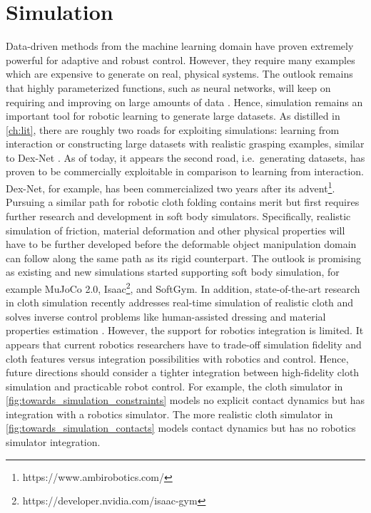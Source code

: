 \documentclass[\home/main.tex]{subfiles}
\begin{document}
\section{Simulation} \label{sec:towards_sim}
Data-driven methods from the machine learning domain have proven extremely powerful for adaptive and robust control. However, they require many examples which are expensive to generate on real, physical systems. The outlook remains that highly parameterized functions, such as neural networks, will keep on requiring and improving on large amounts of data \autocite{sun2017revisiting}. Hence, simulation remains an important tool for robotic learning to generate large datasets. As distilled in \cref{ch:lit}, there are roughly two roads for exploiting simulations: learning from interaction or constructing large datasets with realistic grasping examples, similar to Dex-Net \autocite{dexnet2}. As of today, it appears the second road, i.e.\ generating datasets, has proven to be commercially exploitable in comparison to learning from interaction. Dex-Net, for example, has been commercialized two years after its advent\footnote{https://www.ambirobotics.com/}. Pursuing a similar path for robotic cloth folding contains merit but first requires further research and development in soft body simulators. Specifically,
realistic simulation of friction, material deformation and other physical properties will have to be further developed before the deformable object manipulation domain can follow along the same path as its rigid counterpart. The outlook is promising as existing and new simulations started supporting soft body simulation, for example MuJoCo 2.0, Isaac\footnote{https://developer.nvidia.com/isaac-gym}, and SoftGym. In addition, state-of-the-art research in cloth simulation recently addresses real-time simulation of realistic cloth and solves inverse control problems like human-assisted dressing and material properties estimation \autocite{Junbang2019,li2021diffcloth}. However, the support for robotics integration is limited. It appears that current robotics researchers have to trade-off simulation fidelity and cloth features versus integration possibilities with robotics and control. Hence, future directions should consider a tighter integration between high-fidelity cloth simulation and practicable robot control. For example, the cloth simulator in \cref{fig:towards_simulation_constraints} models no explicit contact dynamics but has integration with a robotics simulator. The more realistic cloth simulator in \cref{fig:towards_simulation_contacts} models contact dynamics but has no robotics simulator integration.
\end{document}
